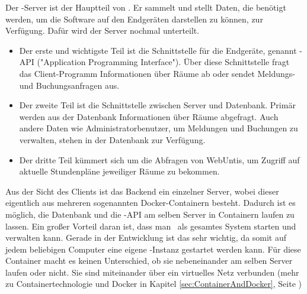 
Der \ZELIA-Server ist der Hauptteil von \ZELIA. Er sammelt und stellt Daten, die benötigt werden, um die Software auf den Endgeräten darstellen zu können, zur Verfügung. Dafür wird der Server nochmal unterteilt.

\begin{itemize}
    \item Der erste und wichtigste Teil ist die Schnittstelle für die Endgeräte, genannt \ZELIA-API ("Application Programming Interface"). Über diese Schnittstelle fragt das Client-Programm Informationen über Räume ab oder sendet Meldungs- und Buchungsanfragen aus.
    \item Der zweite Teil ist die Schnittstelle zwischen Server und Datenbank. Primär werden aus der Datenbank Informationen über Räume abgefragt. Auch andere Daten wie Administratorbenutzer, um Meldungen und Buchungen zu verwalten, stehen in der Datenbank zur Verfügung. 
    \item Der dritte Teil kümmert sich um die Abfragen von WebUntis, um Zugriff auf aktuelle Stundenpläne jeweiliger Räume zu bekommen.
\end{itemize}

Aus der Sicht des Clients ist das Backend ein einzelner Server, wobei dieser eigentlich aus mehreren sogenannten Docker-Containern besteht. Dadurch ist es möglich, die Datenbank und die \ZELIA-API am selben Server in Containern laufen zu lassen. Ein großer Vorteil daran ist, dass man \ZELIA\ als gesamtes System starten und verwalten kann. Gerade in der Entwicklung ist das sehr wichtig, da somit auf jedem beliebigen Computer eine eigene \ZELIA-Instanz gestartet werden kann. Für diese Container macht es keinen Unterschied, ob sie nebeneinander am selben Server laufen oder nicht. Sie sind miteinander über ein virtuelles Netz verbunden (mehr zu Containertechnologie und Docker in Kapitel \ref{sec:ContainerAndDocker}, Seite \pageref{sec:ContainerAndDocker})

